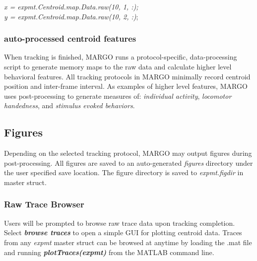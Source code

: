 \documentclass[11pt]{article}
\begin{document}
\begin{center}
	 \textit{x = expmt.Centroid.map.Data.raw(10, 1, :);}\\
	\textit{y = expmt.Centroid.map.Data.raw(10, 2, :)};
\end{center}

\subsubsection{auto-processed centroid features}

When tracking is finished, MARGO runs a protocol-specific, data-processing script to generate memory maps to the raw data and calculate higher level behavioral features. All tracking protocols in MARGO minimally record centroid position and inter-frame interval. As examples of higher level features, MARGO uses post-processing to generate measures of:  \textit{individual activity},  \textit{locomotor handedness}, and  \textit{stimulus evoked behaviors}.

\subsection{Figures}

Depending on the selected tracking protocol, MARGO may output figures during post-processing. All figures are saved to an auto-generated \textit{figures} directory under the user specified save location. The figure directory is saved to \textit{expmt.figdir} in master struct.


\subsubsection{Raw Trace Browser}

Users will be prompted to browse raw trace data upon tracking completion. Select \textbf{\textit{browse traces}} to open a simple GUI for plotting centroid data. Traces from any \textit{expmt} master struct can be browsed at anytime by loading the .mat file and running \textbf{\textit{plotTraces(expmt)}} from the MATLAB command line.
\end{document}
